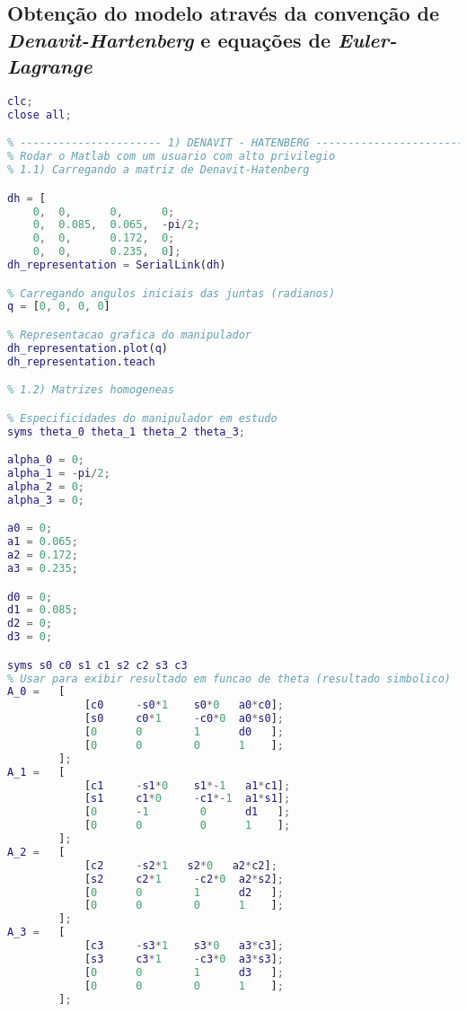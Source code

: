\begin{anexosenv}
\partanexos

\chapter{Obtenção do modelo através da convenção de \textit{Denavit-Hartenberg} e equações de \textit{Euler-Lagrange}}
\label{anexo:denHatEulerLagr}

\begin{lstlisting}[language=Matlab]
clc;
close all;

% ---------------------- 1) DENAVIT - HATENBERG ------------------------
% Rodar o Matlab com um usuario com alto privilegio
% 1.1) Carregando a matriz de Denavit-Hatenberg

dh = [
    0,  0,      0,      0;
    0,  0.085,  0.065,  -pi/2;
    0,  0,      0.172,  0;
    0,  0,      0.235,  0];
dh_representation = SerialLink(dh)

% Carregando angulos iniciais das juntas (radianos)
q = [0, 0, 0, 0]

% Representacao grafica do manipulador
dh_representation.plot(q)
dh_representation.teach

% 1.2) Matrizes homogeneas

% Especificidades do manipulador em estudo
syms theta_0 theta_1 theta_2 theta_3;

alpha_0 = 0;
alpha_1 = -pi/2;
alpha_2 = 0;
alpha_3 = 0;

a0 = 0;
a1 = 0.065;
a2 = 0.172;
a3 = 0.235;

d0 = 0;
d1 = 0.085;
d2 = 0;
d3 = 0;

syms s0 c0 s1 c1 s2 c2 s3 c3
% Usar para exibir resultado em funcao de theta (resultado simbolico)
A_0 =   [
            [c0     -s0*1    s0*0   a0*c0];
            [s0     c0*1     -c0*0  a0*s0];
            [0      0        1      d0   ];
            [0      0        0      1    ];
        ];
A_1 =   [
            [c1     -s1*0    s1*-1   a1*c1];
            [s1     c1*0     -c1*-1  a1*s1];
            [0      -1        0      d1   ];
            [0      0         0      1    ];
        ];
A_2 =   [
            [c2     -s2*1	s2*0   a2*c2];
            [s2     c2*1     -c2*0  a2*s2];
            [0      0        1      d2   ];
            [0      0        0      1    ];
        ];
A_3 =   [
            [c3     -s3*1    s3*0   a3*c3];
            [s3     c3*1     -c3*0  a3*s3];
            [0      0        1      d3   ];
            [0      0        0      1    ];
        ];


\end{lstlisting}
\end{anexosenv}

